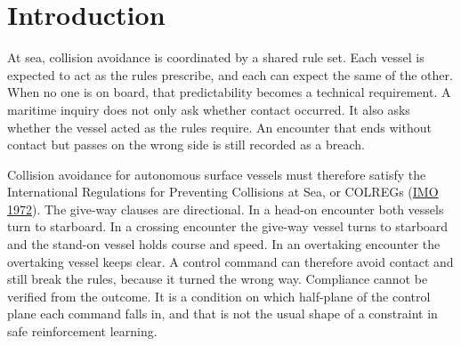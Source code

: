 \documentclass[10pt,letterpaper]{article}
\newcommand{\citl}[2]{(\hyperlink{ref:#1}{#2})}
\begin{document}
%
%
%

\section{Introduction}
\label{sec:intro}

At sea, collision avoidance is coordinated by a shared rule set. Each vessel is expected
to act as the rules prescribe, and each can expect the same of the other. When no one is
on board, that predictability becomes a technical requirement. A maritime inquiry does not only ask whether
contact occurred. It also asks whether the vessel acted as the rules require. An encounter
that ends without contact but passes on the wrong side is still recorded as a breach.

Collision avoidance for autonomous surface vessels must therefore satisfy the International Regulations for Preventing Collisions at Sea,
or COLREGs \citl{imo1972}{IMO 1972}. The give-way clauses are directional. In a head-on encounter both vessels turn to starboard. In a crossing
encounter the give-way vessel turns to starboard and the stand-on vessel holds course and
speed. In an overtaking encounter the overtaking vessel keeps clear. A control command can
therefore avoid contact and still break the rules, because it turned the wrong way.
Compliance cannot be verified from the outcome. It is a condition on which half-plane of the
control plane each command falls in, and that is not the usual shape of a constraint in safe
reinforcement learning.
\end{document}
